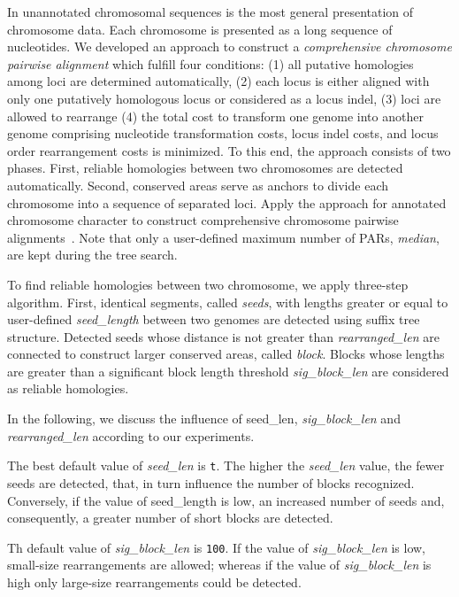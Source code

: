 In unannotated chromosomal sequences is the most general presentation of
chromosome data. Each chromosome is presented as a long sequence of nucleotides.
We developed an approach to construct a \emph{comprehensive chromosome pairwise
 alignment} which fulfill four conditions:
(1) all putative homologies among loci are determined automatically, 
(2) each locus is either aligned with only one putatively homologous locus or
considered as a locus indel, 
(3) loci are allowed to rearrange
(4) the total cost to transform one genome into another genome
comprising nucleotide transformation costs, locus indel costs, 
and locus order rearrangement costs is minimized.  To this end, 
the approach consists of two phases. First, reliable homologies 
between two chromosomes are detected automatically. Second,
conserved areas serve as anchors to divide each chromosome into 
a sequence of separated loci. Apply the approach for annotated chromosome character
to construct comprehensive chromosome pairwise alignments~\cite{vinh2007}. 
Note that only a user-defined maximum number of PARs, \emph{median},  are kept
during the tree search.


To find reliable homologies between two chromosome, we apply three-step algorithm.
First, identical segments, called \emph{seeds}, with lengths greater or equal to
user-defined \emph{seed\_length} between two genomes are detected using suffix tree
structure. Detected seeds whose distance is not greater than
\emph{rearranged\_len} are connected to construct larger conserved areas, called
\emph{block}. Blocks whose lengths are greater than a significant block length 
threshold \emph{sig\_block\_len} are considered as reliable homologies. 

In the following, we discuss the influence of {seed\_len},
\emph{sig\_block\_len} and \emph{rearranged\_len} according to our experiments.

The best default value of \emph{seed\_len} is \texttt{t}.
The higher the \emph{seed\_len} value, the fewer seeds are detected,
that, in turn influence the number of blocks recognized. Conversely, if the
value of seed\_length is low, an increased number of seeds and, consequently, a
greater number of short blocks are detected.

Th default value of \emph{sig\_block\_len} is \texttt{100}. 
If the value of \emph{sig\_block\_len} is low, small-size rearrangements are allowed;
whereas if the value of \emph{sig\_block\_len} is high only large-size
rearrangements could be detected.

